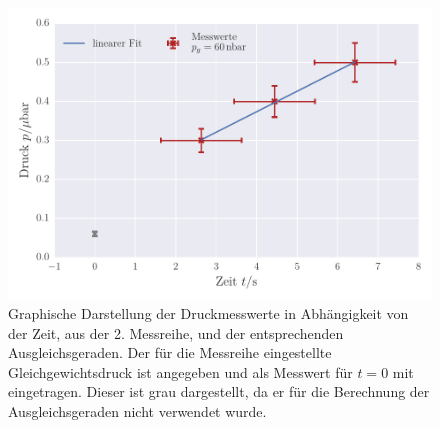 \begin{figure}[!h]
 \centering
 \includegraphics[scale=0.8]{../Grafiken/Leckrate_Turbo_1.pdf}	
 \caption{Graphische Darstellung der Druckmesswerte in Abhängigkeit von der Zeit, aus der 2. Messreihe, und der
 	entsprechenden Ausgleichsgeraden. Der für die Messreihe eingestellte Gleichgewichtsdruck ist angegeben und als Messwert für $t=0$ mit eingetragen. Dieser ist grau dargestellt, da er für die 
 	Berechnung der Ausgleichsgeraden nicht verwendet wurde.  \label{fig:leckrate_turbo_1}}
 \end{figure} 